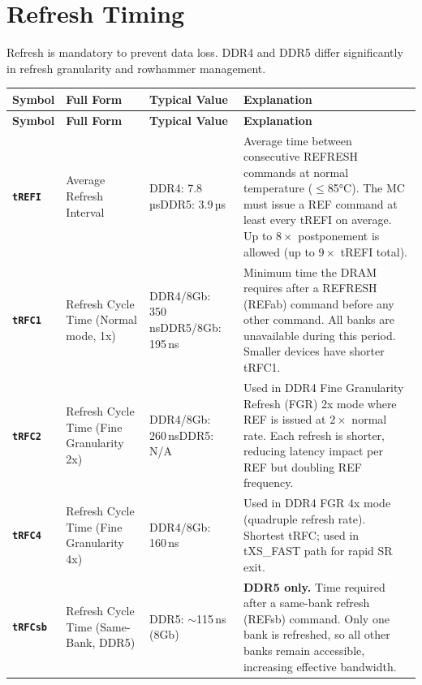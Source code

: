 \documentclass[11pt,a4paper]{article}
\newcommand{\sym}[1]{\texttt{\textbf{#1}}}
\begin{document}
\section{Refresh Timing}

Refresh is mandatory to prevent data loss. DDR4 and DDR5 differ significantly 
in refresh granularity and rowhammer management.

\begin{longtable}{L{2.2cm} L{4.8cm} L{3.5cm} L{4cm}}
\toprule
\textbf{Symbol} & \textbf{Full Form} & \textbf{Typical Value} & \textbf{Explanation} \\
\midrule
\endfirsthead
\toprule
\textbf{Symbol} & \textbf{Full Form} & \textbf{Typical Value} & \textbf{Explanation} \\
\midrule
\endhead
\bottomrule
\endfoot

\sym{tREFI} & Average Refresh Interval & DDR4: 7.8\,µs\newline DDR5: 3.9\,µs &
  Average time between consecutive REFRESH commands at normal temperature ($\leq$85°C).
  The MC must issue a REF command at least every tREFI on average.
  Up to $8\times$ postponement is allowed (up to $9\times$ tREFI total). \\

\sym{tRFC1} & Refresh Cycle Time (Normal mode, 1x) & DDR4/8Gb: 350\,ns\newline DDR5/8Gb: 195\,ns &
  Minimum time the DRAM requires after a REFRESH (REFab) command before any other command.
  All banks are unavailable during this period. Smaller devices have shorter tRFC1. \\

\sym{tRFC2} & Refresh Cycle Time (Fine Granularity 2x) & DDR4/8Gb: 260\,ns\newline DDR5: N/A &
  Used in DDR4 Fine Granularity Refresh (FGR) 2x mode where REF is issued at $2\times$ normal rate.
  Each refresh is shorter, reducing latency impact per REF but doubling REF frequency. \\

\sym{tRFC4} & Refresh Cycle Time (Fine Granularity 4x) & DDR4/8Gb: 160\,ns &
  Used in DDR4 FGR 4x mode (quadruple refresh rate). 
  Shortest tRFC; used in tXS\_FAST path for rapid SR exit. \\

\sym{tRFCsb} & Refresh Cycle Time (Same-Bank, DDR5) & DDR5: $\sim$115\,ns (8Gb) &
  \textbf{DDR5 only.} Time required after a same-bank refresh (REFsb) command.
  Only one bank is refreshed, so all other banks remain accessible, increasing effective bandwidth. \\


\end{longtable}
\end{document}
